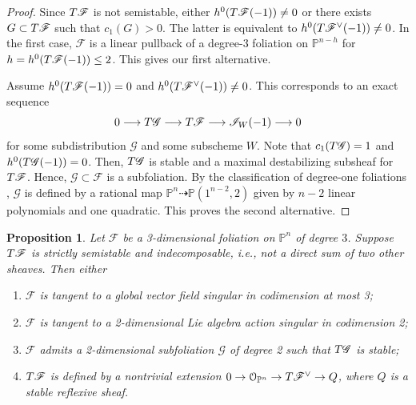 \documentclass[twoside]{amsart}
\numberwithin{equation}{section}
\newcommand{\p}[1]{{\mathbb{P}^{#1}}}
\newcommand{\opn}{{\mathcal O}_{\mathbb{P}^{n}}}
\newcommand{\pn}{{\mathbb{P}^{n}}}
\newcommand{\sI}{\mathscr{I}}
\def\PP{{\mathbb{P}}}
\newcommand{\sF}{\mathscr{F}}
\newcommand{\sG}{\mathscr{G}}
\newcommand{\tF}{{\rm T}\sF}
\newcommand{\tG}{{\rm T}\sG}
\newcommand{\lra}{ \longrightarrow }
\newtheorem{proposition}[theorem]{Proposition}
\theoremstyle{definition}
\begin{document}
\begin{proof}
Since $\tF$ is not semistable, either $h^0(\tF(-1)) \neq 0$ or there exists $G\subset \tF$ such that $c_1(G) >0$. The latter is equivalent to $h^0(\tF^\vee(-1)) \neq 0$. In the first case, $\sF$ is a linear pullback of a degree-3 foliation on $\p{n-h}$ for $h = h^0(\tF(-1)) \leq 2$. This gives our first alternative.

Assume $h^0(\tF(-1)) = 0$ and $h^0(\tF^\vee(-1)) \neq 0$. This corresponds to an exact sequence
\[
0 \lra \tG \lra \tF \lra \sI_W(-1) \lra 0 
\]
for some subdistribution $\sG$ and some subscheme $W$. Note that $c_1(\tG) = 1$ and $h^0(\tG(-1)) = 0$. Then, $\tG$ is stable and a maximal destabilizing subsheaf for $\tF$. Hence, $\sG \subset \sF$ is a subfoliation. By the classification of degree-one foliations \cite[Theorem 6.2]{LPT2}, $\sG$ is defined by a rational map $\pn \dashrightarrow \PP(1^{n-2},2)$ given by $n-2$ linear polynomials and one quadratic. This proves the second alternative.
\end{proof}

\begin{proposition}
Let $\sF$ be a 3-dimensional foliation on $\pn$ of degree $3$. Suppose $\tF$ is strictly semistable and indecomposable, i.e., not a direct sum of two other sheaves. Then either
\begin{enumerate}
    \item $\sF$ is tangent to a global vector field singular in codimension at most 3;
    \item $\sF$ is tangent to a 2-dimensional Lie algebra action singular in codimension 2;
    \item $\sF$ admits a 2-dimensional subfoliation $\sG$ of degree 2  such that $\tG$ is stable;
    \item $\tF$ is defined by a nontrivial extension $0 \to \opn \to \tF^\vee \to Q$, where $Q$ is a stable reflexive sheaf. 
\end{enumerate}

\end{proposition}
\end{document}
